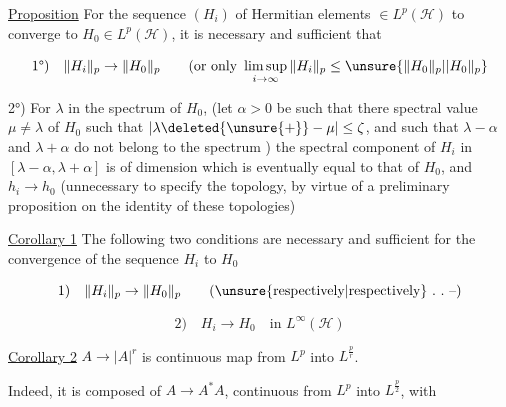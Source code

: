 \uline{Proposition} For the sequence $(H_i)$ of Hermitian elements $\in L^p(\mathscr H)$ to converge to $H_0\in L^p(\mathscr H)$, it is necessary and sufficient that

\[
\text{1°)}\quad\|H_i\|_p\to\|H_0\|_p\qquad
\text{(or only }\limsup_{i\to\infty}\|H_i\|_p\leq\unsure{\|H_0\|_p|\lvert H_0\|_p}
\]

2°) For  $\lambda$ in the spectrum of $H_0$, (let $\alpha>0$ be such that there  spectral value $\mu\neq\lambda$ of $H_0$ such that $|\lambda\deleted{\unsure{+}}-\mu|\leq\zeta$,   and such that $\lambda-\alpha$ and $\lambda+\alpha$ do not belong to the spectrum )  the spectral component of $H_i$  in $[\lambda-\alpha,\lambda+\alpha]$ is of dimension  which is eventually equal to that of $H_0$, and $h_i\to h_0$ (unnecessary to specify the topology, by virtue of a preliminary proposition on the identity of  these topologies)


\uline{Corollary 1} The following two conditions are necessary and sufficient  for the convergence of the sequence $H_i$ to $H_0$

\[
\text{1)}\quad\|H_i\|_p\to\|H_0\|_p\qquad\text{(\unsure{respectively|respectively} .\ .\ --)}
\]

\[
\text{2)}\quad H_i\to H_0\quad\text{in }L^\infty(\mathscr H)
\]

\uline{Corollary 2} $A\to |A|^r$ is continuous map from $L^p$ into $L^{\frac pr}$.

Indeed, it is composed of $A\to A^*A$, continuous from $L^p$ into $L^{\frac p2}$, with
